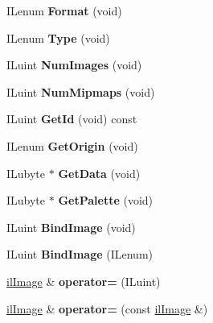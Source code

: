 \begin{DoxyCompactItemize}
\item 
\hypertarget{classil_image_af4092f81a7c2f543de961516bd290e92}{I\+Lenum {\bfseries Format} (void)}\label{classil_image_af4092f81a7c2f543de961516bd290e92}

\item 
\hypertarget{classil_image_a0f88daf2f95d135412819ccebe4f087f}{I\+Lenum {\bfseries Type} (void)}\label{classil_image_a0f88daf2f95d135412819ccebe4f087f}

\item 
\hypertarget{classil_image_acf420c47cc22431d30df40c18f20029f}{I\+Luint {\bfseries Num\+Images} (void)}\label{classil_image_acf420c47cc22431d30df40c18f20029f}

\item 
\hypertarget{classil_image_a4b0c1e2439954785a270cdafd8ed7aa6}{I\+Luint {\bfseries Num\+Mipmaps} (void)}\label{classil_image_a4b0c1e2439954785a270cdafd8ed7aa6}

\item 
\hypertarget{classil_image_ab13a35fe2c61f962c540fbcc21d668a9}{I\+Luint {\bfseries Get\+Id} (void) const }\label{classil_image_ab13a35fe2c61f962c540fbcc21d668a9}

\item 
\hypertarget{classil_image_a9525278b3752ba48ed4c1493750b6484}{I\+Lenum {\bfseries Get\+Origin} (void)}\label{classil_image_a9525278b3752ba48ed4c1493750b6484}

\item 
\hypertarget{classil_image_afea12e91481d98b4f801bbb44970a31e}{I\+Lubyte $\ast$ {\bfseries Get\+Data} (void)}\label{classil_image_afea12e91481d98b4f801bbb44970a31e}

\item 
\hypertarget{classil_image_a4b5de527399765ca26f0d294e3520720}{I\+Lubyte $\ast$ {\bfseries Get\+Palette} (void)}\label{classil_image_a4b5de527399765ca26f0d294e3520720}

\item 
\hypertarget{classil_image_a20419985cd158ae99813ee6d9d62dd2d}{I\+Luint {\bfseries Bind\+Image} (void)}\label{classil_image_a20419985cd158ae99813ee6d9d62dd2d}

\item 
\hypertarget{classil_image_abc9220154ab6bc7f58810dba221a63ef}{I\+Luint {\bfseries Bind\+Image} (I\+Lenum)}\label{classil_image_abc9220154ab6bc7f58810dba221a63ef}

\item 
\hypertarget{classil_image_a460cdc6b81aa896adac2cf2166662c3a}{\hyperlink{classil_image}{il\+Image} \& {\bfseries operator=} (I\+Luint)}\label{classil_image_a460cdc6b81aa896adac2cf2166662c3a}

\item 
\hypertarget{classil_image_a124b7bc379025a1d614db605b250b00a}{\hyperlink{classil_image}{il\+Image} \& {\bfseries operator=} (const \hyperlink{classil_image}{il\+Image} \&)}\label{classil_image_a124b7bc379025a1d614db605b250b00a}

\end{DoxyCompactItemize}
